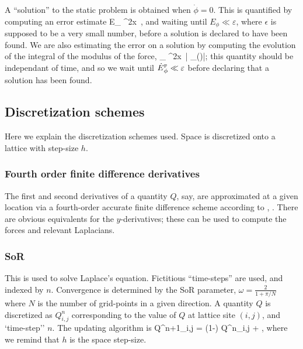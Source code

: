 \documentclass[a4paper, 12pt]{article}
\numberwithin{equation}{section}
\begin{document}
A ``solution'' to the static problem is obtained when $\dot{\phi}=0$. This is quantified by computing an error estimate
\bea
E_{\phi}  \int \dd^2x\, \dot{\phi},
\eea
and waiting until $E_{\phi}\ll \varepsilon$, where $\epsilon$ is supposed to be a very small number, before a solution is declared to have been found. We are also estimating the error on a solution by computing the evolution of the integral of the modulus of the force,
\bea
{}_{\phi}  \int \dd^2x\, \left| _{(\phi)}\right|;
\eea
this quantity should be independant of time, and so we wait until $\dot{E}{}^{\scriptscriptstyle{\textrm{F}}}_{\phi}\ll \varepsilon$ before declaring that a solution has been found.



\subsection{Discretization schemes}
Here we explain the discretization schemes used. Space is discretized onto a lattice with step-size $h$.

\subsubsection{Fourth order finite difference derivatives}
The first and second derivatives of a quantity $Q$, say, are approximated at a given location via a fourth-order accurate finite difference scheme according to
\bea
{} \approx {},
\eea
\bea
{} \approx {}.
\eea
There are obvious equivalents for the $y$-derivatives; these can be used to compute the forces and relevant Laplacians.

\subsubsection{SoR} 
This is used to solve Laplace's equation. Fictitious ``time-steps'' are used, and indexed by $n$. Convergence is determined by the SoR parameter, $\omega = \frac{2}{1+ {\pi}/{N}}$ where $N$ is the number of grid-points in a given direction. A quantity $Q$ is discretized as $Q^n_{i,j}$ corresponding to the value of $Q$ at lattice site $(i,j)$, and `time-step'' $n$. The updating algorithm is
\bea
Q^{n+1}_{i,j} = (1-\omega) Q^{n}_{i,j} + ,
\eea
where we remind that $h$ is the space step-size.
\end{document}
